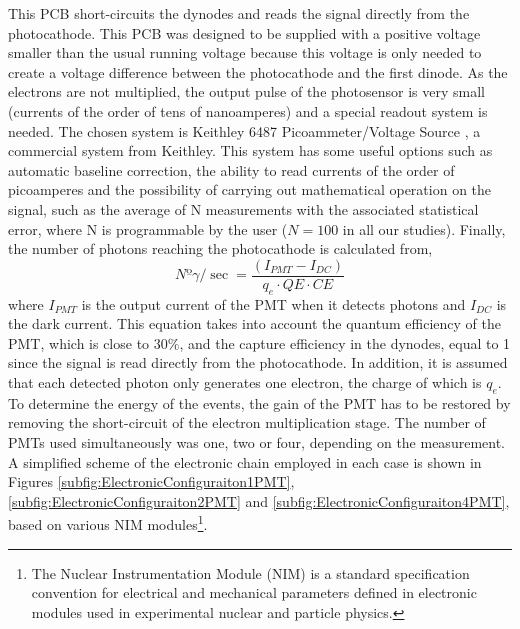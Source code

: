 This PCB short-circuits the dynodes and reads the signal directly from the photocathode. This PCB was designed to be supplied with a positive voltage smaller than the usual running voltage because this voltage is only needed to create a voltage difference between the photocathode and the first dinode. As the electrons are not multiplied, the output pulse of the photosensor is very small (currents of the order of tens of nanoamperes) and a special readout system is needed. The chosen system is Keithley 6487 Picoammeter/Voltage Source \cite{DataSheetKeithley6487}, a commercial system from Keithley. This system has some useful options such as automatic baseline correction, the ability to read currents of the order of picoamperes and the possibility of carrying out mathematical operation on the signal, such as the average of N measurements with the associated statistical error, where N is programmable by the user ($N=100$ in all our studies). Finally, the number of photons reaching the photocathode is calculated from,
\begin{equation}
Nº\gamma/\sec = \frac{\left( I_{PMT} - I_{DC} \right)}{q_e \cdot{} QE \cdot{} CE}
\label{eq:NumPhotonsFromIntensityPMT}
\end{equation}
where $I_{PMT}$ is the output current of the PMT when it detects photons and $I_{DC}$ is the dark current. This equation takes into account the quantum efficiency of the PMT, which is close to $30\%$, and the capture efficiency in the dynodes, equal to 1 since the signal is read directly from the photocathode. In addition, it is assumed that each detected photon only generates one electron, the charge of which is $q_e$. To determine the energy of the events, the gain of the PMT has to be restored by removing the short-circuit of the electron multiplication stage. The number of PMTs used simultaneously was one, two or four, depending on the measurement. A simplified scheme of the electronic chain employed in each case is shown in Figures \ref{subfig:ElectronicConfiguraiton1PMT}, \ref{subfig:ElectronicConfiguraiton2PMT} and \ref{subfig:ElectronicConfiguraiton4PMT}, based on various NIM modules\footnote{The Nuclear Instrumentation Module (NIM) is a standard specification convention for electrical and mechanical parameters defined in electronic modules used in experimental nuclear and particle physics.}.

